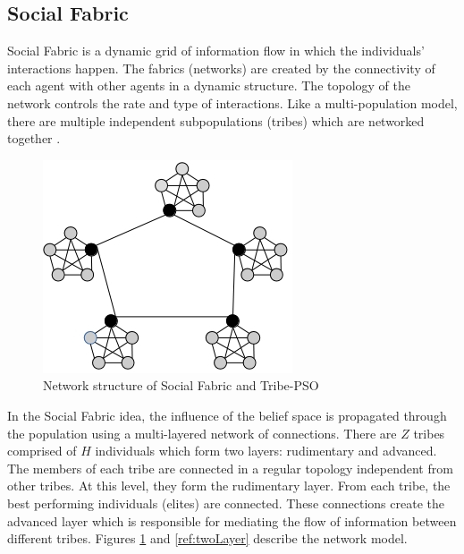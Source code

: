 \documentclass[letterpaper]{article}
\begin{document}
\subsection{Social Fabric}
Social Fabric is a dynamic grid of information flow in which the individuals' interactions happen. The fabrics (networks) are created by the connectivity of each agent with other agents in a dynamic structure. The topology of the network controls the rate and type of interactions. Like a multi-population model, there are multiple independent subpopulations (tribes) which are networked together \cite{ali2011boosting}.\newline
\begin{figure}[h]
	\includegraphics[scale=0.6]{tpso}
	\centering
	\caption{Network structure of Social Fabric and Tribe-PSO}
	\label{ref:tpso}
\end{figure}
In the Social Fabric idea, the influence of the belief space is propagated through the population using a multi-layered network of connections. There are $Z$ tribes comprised of $H$ individuals which form two layers: rudimentary and advanced. The members of each tribe are connected in a regular topology independent from other tribes. At this level, they form the rudimentary layer. From each tribe, the best performing individuals (elites) are connected. These connections create the advanced layer which is responsible for mediating the flow of information between different tribes. Figures \ref{ref:tpso} and \ref{ref:twoLayer} describe the network model.
\end{document}

